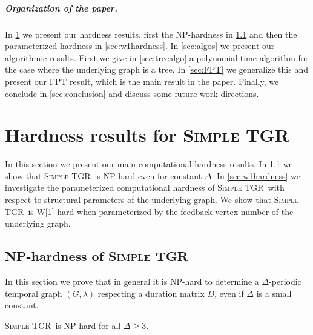 \documentclass[a4paper,UKenglish,cleveref, autoref, thm-restate]{lipics-v2021}
\newcommand{\NP}{\textrm{NP}}
\newcommand{\deltaExact}{\textsc{Simple TGR}}
\begin{document}
\subparagraph{Organization of the paper.}
In \cref{sec:hardness} we present our hardness results, first the NP-hardness in \cref{sec:nphardness} and then the parameterized hardness in \cref{sec:w1hardness}. In \cref{sec:algos} we present our algorithmic results. First we give in \cref{sec:treealgo} a polynomial-time algorithm for the case where the underlying graph is a tree. In \cref{sec:FPT} we generalize this and present our FPT result, which is the main result in the paper. Finally, we conclude in \cref{sec:conclusion} and discuss some future work directions.

\section{Hardness results for \deltaExact}\label{sec:hardness}
In this section we present our main computational hardness results. In \cref{sec:nphardness} we show that \deltaExact\ is NP-hard even for constant $\Delta$. In \cref{sec:w1hardness} we investigate the parameterized computational hardness of \deltaExact\ with respect to structural parameters of the underlying graph. We show that \deltaExact\ is W[1]-hard when parameterized by the feedback vertex number of the underlying graph.

\subsection{NP-hardness of \deltaExact}\label{sec:nphardness}
In this section we prove that in general it is NP-hard to determine a $\Delta$-periodic temporal graph $(G,\lambda)$ respecting a duration matrix $D$,
even if $\Delta$ is a small constant.

\begin{theorem}\label{thm:NPhardness}
	\deltaExact\ is \NP-hard for all $\Delta \geq 3$.
\end{theorem}
\end{document}

